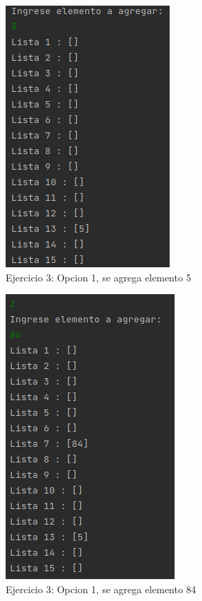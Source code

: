 \documentclass{article}
\begin{document}
			\begin{figure}[H]
				\centering
				\includegraphics{images/e32.png}
				\caption*{Ejercicio 3: Opcion 1, se agrega elemento 5}
			\end{figure}
			
			\begin{figure}[H]
				\centering
				\includegraphics{images/e33.png}
				\caption*{Ejercicio 3: Opcion 1, se agrega elemento 84}
			\end{figure}
			
\end{document}
